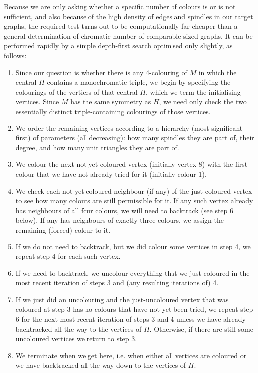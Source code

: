 \documentclass{amsart}
\theoremstyle{definition}
\theoremstyle{remark}
\numberwithin{equation}{section}
\begin{document}
Because we are only asking whether a specific number of colours is or is not sufficient, and also because of the high density of edges and spindles in our target graphs, the required test turns out to be computationally far cheaper than a general determination of chromatic number of comparable-sized graphs. It can be performed rapidly by a simple depth-first search optimised only slightly, as follows:
\begin{enumerate}
\item Since our question is whether there is any 4-colouring of $M$ in which the central $H$ contains a monochromatic triple, we begin by specifying the colourings of the vertices of that central $H$, which we term the initialising vertices. Since $M$ has the same symmetry as $H$, we need only check the two essentially distinct triple-containing colourings of those vertices.
\item We order the remaining vertices according to a hierarchy (most significant first) of parameters (all decreasing): how many spindles they are part of, their degree, and how many unit triangles they are part of.
\item We colour the next not-yet-coloured vertex (initially vertex 8) with the first colour that we have not already tried for it (initially colour 1).
\item We check each not-yet-coloured neighbour (if any) of the just-coloured vertex to see how many colours are still permissible for it. If any such vertex already has neighbours of all four colours, we will need to backtrack (see step 6 below). If any has neighbours of exactly three colours, we assign the remaining (forced) colour to it.
\item If we do not need to backtrack, but we did colour some vertices in step 4, we repeat step 4 for each such vertex.
\item If we need to backtrack, we uncolour everything that we just coloured in the most recent iteration of steps 3 and (any resulting iterations of) 4.
\item If we just did an uncolouring and the just-uncoloured vertex that was coloured at step 3 has no colours that have not yet been tried, we repeat step 6 for the next-most-recent iteration of steps 3 and 4 unless we have already backtracked all the way to the vertices of $H$. Otherwise, if there are still some uncoloured vertices we return to step 3.
\item We terminate when we get here, i.e. when either all vertices are coloured or we have backtracked all the way down to the vertices of $H$.
\end{enumerate}
\end{document}

